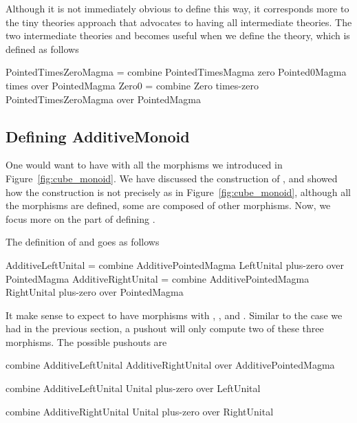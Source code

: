 Although it is not immediately obvious to define  this way, it corresponds more to the tiny theories approach that advocates to having all intermediate theories. The two intermediate theories  and  becomes useful when we define the  theory, which is defined as follows 
\begin{togcode}
PointedTimesZeroMagma = 
  combine PointedTimesMagma zero Pointed0Magma times 
  over PointedMagma 
Zero0 = 
  combine Zero times-zero PointedTimesZeroMagma {} 
  over PointedMagma 
\end{togcode}

\subsection{Defining AdditiveMonoid}
One would want to have  with all the morphisms we introduced in Figure~\ref{fig:cube_monoid}. %
We have discussed the construction of , and showed how the construction is not precisely as in Figure~\ref{fig:cube_monoid}, although all the morphisms are defined, some are composed of other morphisms. Now, we focus more on the part of defining . 

The definition of  and  goes as follows 
\begin{togcode}
AdditiveLeftUnital = 
  combine AdditivePointedMagma {} LeftUnital plus-zero 
  over PointedMagma
AdditiveRightUnital = 
  combine AdditivePointedMagma {} RightUnital plus-zero 
  over PointedMagma
\end{togcode} 
It make sense to expect  to have morphisms with , , and . Similar to the case we had in the previous section, a pushout will only compute two of these three morphisms. The possible pushouts are 
\begin{togcode}
combine AdditiveLeftUnital {} AdditiveRightUnital {} 
over AdditivePointedMagma
\end{togcode}

\begin{togcode}
combine AdditiveLeftUnital {} Unital plus-zero 
over LeftUnital 
\end{togcode}

\begin{togcode}
combine AdditiveRightUnital {} Unital plus-zero 
over RightUnital 
\end{togcode}

